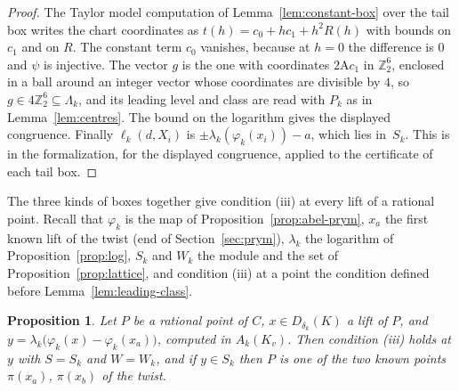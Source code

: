\documentclass[11pt]{amsart}
\newtheorem{proposition}[theorem]{Proposition}
\theoremstyle{definition}
\numberwithin{equation}{section}
\newcommand{\Zt}{\mathbb{Z}_2}
\newcommand{\kv}{K_v}
\newcommand{\lean}[1]{\ignorespaces}
\begin{document}
\begin{proof}
The Taylor model computation of Lemma~\ref{lem:constant-box} over the tail box writes the chart coordinates as $t(h)=c_0+hc_1+h^2R(h)$ with bounds on $c_1$ and on $R$. The constant term $c_0$ vanishes, because at $h=0$ the difference is $0$ and $\psi$ is injective. The vector $g$ is the one with coordinates $2\mathrm Ac_1$ in $\Zt^6$, enclosed in a ball around an integer vector whose coordinates are divisible by $4$, so $g\in4\Zt^6\subseteq\Lambda_k$, and its leading level and class are read with $P_k$ as in Lemma~\ref{lem:centres}. The bound on the logarithm gives the displayed congruence. Finally $\ell_k(d,X_i)$ is $\pm\lambda_k(\varphi_k(x_i))-a$, which lies in~$S_k$. This is  in the formalization, for the displayed congruence, applied to the certificate of each tail box.
\end{proof}

The three kinds of boxes together give condition (iii) at every lift of a rational point. Recall that $\varphi_k$ is the map of Proposition~\ref{prop:abel-prym}, $x_a$ the first known lift of the twist (end of Section~\ref{sec:prym}), $\lambda_k$ the logarithm of Proposition~\ref{prop:log}, $S_k$ and $W_k$ the module and the set of Proposition~\ref{prop:lattice}, and condition (iii) at a point the condition defined before Lemma~\ref{lem:leading-class}.

\begin{proposition}\label{prop:cover}\lean{FurioLombardo.Discharge.M4Box.coverIII_knownZero_of_M4_w, FurioLombardo.Discharge.M4Box.lead_or_known_w, FurioLombardo.Discharge.M4Cert.tailGood_T0_Mmat, FurioLombardo.Discharge.M4Cert.tailGood_T1_Mmat, FurioLombardo.Discharge.M4Box.hLog_of_cover, FurioLombardo.Discharge.M4Box.m4RestKvW_0, FurioLombardo.Discharge.M4Box.m4RestKvW_1, FurioLombardo.Discharge.M4Box.M4RestKvW.toM4RestW, FurioLombardo.Discharge.M4Box.twistInputs_of_KvW, FurioLombardo.M4.T0.checks, FurioLombardo.M4.T1.checks, FurioLombardo.Discharge.M4Box.T0_tailsFour, FurioLombardo.Discharge.M4Box.T1_tailsFour, FurioLombardo.Discharge.M4Box.T0_twistRoute_KvW, FurioLombardo.Discharge.M4Box.T1_twistRoute_KvW, FurioLombardo.Discharge.M4Box.inputs_of_M4_w}
Let $P$ be a rational point of $C$, $x\in D_{\delta_k}(K)$ a lift of $P$, and $y=\lambda_k\bigl(\varphi_k(x)-\varphi_k(x_a)\bigr)$, computed in $A_k(\kv)$. Then condition (iii) holds at $y$ with $S=S_k$ and $W=W_k$, and if $y\in S_k$ then $P$ is one of the two known points $\pi(x_a)$, $\pi(x_b)$ of the twist.
\end{proposition}
\end{document}
